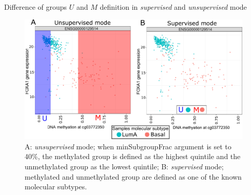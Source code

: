 \documentclass[slidestop,compress,11pt,xcolor=dvipsnames]{beamer}
\begin{document}
\begin{frame}{\normalsize{Difference of groups $U$ and $M$ definition in \textit{supervised} and \textit{unsupervised} mode}} 

 \vspace*{-0.3cm}
 \begin{figure}
 \centering
  \includegraphics[width=1.0\linewidth]{ELMER/mode.pdf}
  \scriptsize{\caption{ A:  \textit{unsupervised} mode; when minSubgroupFrac argument is set to 40\%, the methylated group is defined as the highest quintile and the unmethylated group as the lowest quintile; B:  \textit{supervised} mode; methylated and unmethylated group are defined as one of the known molecular subtypes.}}
 \end{figure}
\end{frame}



\end{document}
